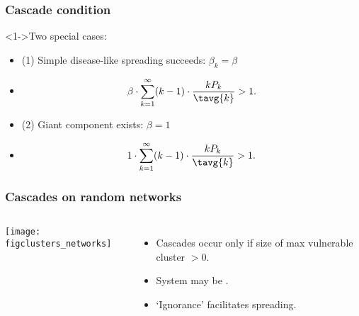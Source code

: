  \begin{frame}
    \frametitle{Cascade condition}

    \begin{block}<1->{Two special cases:}
      \begin{itemize}
      \item<2-> 
        (1) Simple disease-like spreading succeeds: $\beta_k = \beta$
      \item<3->[]
        $$
        \beta 
        \cdot 
        \sum_{k=1}^{\infty} 
        (k-1) 
        \cdot 
        \frac{k P_k}{\tavg{k}} > 1.
        $$
      \item<4-> 
        (2) Giant component exists: $\beta = 1$
      \item<5->[]
        $$
        1 \cdot
        \sum_{k=1}^{\infty} 
        (k-1) 
        \cdot 
        \frac{k P_k}{\tavg{k}}
        > 1.
        $$
      \end{itemize}
    \end{block}

\end{frame}




\begin{frame}
  \frametitle{Cascades on random networks}
  \begin{block}{}
    \begin{columns}
      \texttt{[image: figclusters\_networks]}\\
      \begin{itemize}
      \item<1-> Cascades occur only if size of max vulnerable cluster $>0$.\\
      \item<2-> 
        System may be .\nocite{carlson1999a,carlson2000a,sornette2003a}
      \item<3-> 
        \alert{`Ignorance'} facilitates spreading.
      \end{itemize}
    \end{columns}
  \end{block}


\end{frame}

